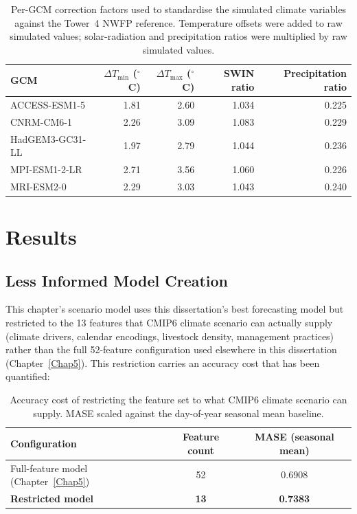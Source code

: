 \begin{table}[htbp]
\centering
\small
\renewcommand{\arraystretch}{1.1}
\begin{tabular}{lrrrr}
\toprule
GCM & $\Delta T_{\min}$ ($^\circ$C) & $\Delta T_{\max}$ ($^\circ$C) &
SWIN ratio & Precipitation ratio \\
\midrule
ACCESS-ESM1-5   & 1.81 & 2.60 & 1.034 & 0.225 \\
CNRM-CM6-1      & 2.26 & 3.09 & 1.083 & 0.229 \\
HadGEM3-GC31-LL & 1.97 & 2.79 & 1.044 & 0.236 \\
MPI-ESM1-2-LR   & 2.71 & 3.56 & 1.060 & 0.226 \\
MRI-ESM2-0      & 2.29 & 3.03 & 1.043 & 0.240 \\
\bottomrule
\end{tabular}
\caption{Per-GCM correction factors used to standardise the simulated climate variables against the Tower~4 NWFP reference. Temperature offsets were added to raw simulated values; solar-radiation and
precipitation ratios were multiplied by raw simulated values.}
\label{tab:climate_standardisation}
\end{table}

\section{Results}

\subsection{Less Informed Model Creation}

This chapter's scenario model uses this dissertation's best forecasting model but restricted to
the 13 features that CMIP6 climate scenario can actually supply (climate drivers, calendar
encodings, livestock density, management practices) rather than the full
52-feature configuration used elsewhere in this dissertation (Chapter~\ref{Chap5}). This
restriction carries an accuracy cost that has been quantified:

\begin{table}[h]
\centering
\small
\renewcommand{\arraystretch}{1.1}
\begin{tabular}{lcc}
\toprule
Configuration & Feature count & MASE (seasonal mean) \\
\midrule
Full-feature model (Chapter~\ref{Chap5}) & 52 & 0.6908 \\
\textbf{Restricted model} & \textbf{13} & \textbf{0.7383} \\
\bottomrule
\end{tabular}
\caption{Accuracy cost of restricting the feature set to what CMIP6
climate scenario can supply. MASE scaled against the day-of-year seasonal mean baseline.}
\label{tab:sp_less_informed}
\end{table}

